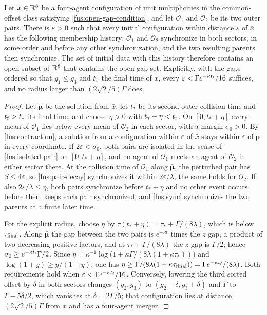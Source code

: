 Let $\bar x\in\mathbb R^8$ be a four-agent configuration of unit multiplicities in
the common-offset class satisfying \cref{fus:open-gap-condition}, and let
$\mathcal O_1$ and $\mathcal O_2$ be its two outer pairs. There is
$\varepsilon>0$ such that every initial configuration within distance
$\varepsilon$ of $\bar x$ has the following membership history:
$\mathcal O_1$ and $\mathcal O_2$ synchronize in both sectors, in some order
and before any other synchronization, and the two resulting parents then
synchronize. The set of initial data with this history therefore contains an
open subset of $\mathbb R^8$ that contains the open-gap set. Explicitly, with the
gaps ordered so that $g_1\leq g_3$ and $t_{\rm f}$ the final time of
$\bar x$, every $\varepsilon<\Gamma e^{-\kappa t_{\rm f}}/16$ suffices, and
no radius larger than $(2\sqrt2/5)\Gamma$ does.
\begin{proof}
Let $\bar{\boldsymbol\mu}$ be the solution from $\bar x$, let $t_*$ be its
second outer collision time and $t_{\rm f}>t_*$ its final time, and choose
$\eta>0$ with $t_*+\eta<t_{\rm f}$. On $[0,t_*+\eta]$ every mean of
$\mathcal O_1$ lies below every mean of $\mathcal O_2$ in each sector, with a
margin $\sigma_0>0$. By \cref{fus:contraction}, a solution from a
configuration within $\varepsilon$ of $\bar x$ stays within $\varepsilon$
of $\bar{\boldsymbol\mu}$ in every coordinate. If $2\varepsilon<\sigma_0$,
both pairs are isolated in the sense of \cref{fus:isolated-pair} on
$[0,t_*+\eta]$, and no agent of $\mathcal O_1$ meets an agent of
$\mathcal O_2$ in either sector there. At the collision time of
$\mathcal O_1$ along $\bar{\boldsymbol\mu}$, the perturbed pair has
$S\leq4\varepsilon$, so \cref{fus:pair-decay} synchronizes it within
$2\varepsilon/\lambda$; the same holds for $\mathcal O_2$. If also
$2\varepsilon/\lambda\leq\eta$, both pairs synchronize before
$t_*+\eta$ and no other event occurs before then. 
keeps each pair synchronized, and \cref{fus:sync} synchronizes the two
parents at a finite later time.

For the explicit radius, choose $\eta$ by
$\tau(t_*+\eta)=\tau_*+\Gamma/(8\lambda)$, which is below $\tau_{\rm final}$.
Along $\bar{\boldsymbol\mu}$ the gap between the two pairs is
$e^{-\kappa t}$ times the $z$ gap, a product of two decreasing positive
factors, and at $\tau_*+\Gamma/(8\lambda)$ the $z$ gap is $\Gamma/2$; hence
$\sigma_0\geq e^{-\kappa t_{\rm f}}\Gamma/2$. Since
$\eta=\kappa^{-1}\log\bigl(1+\kappa\Gamma/(8\lambda(1+\kappa\tau_*))\bigr)$
and $\log(1+y)\geq y/(1+y)$, one has
$\eta\geq\Gamma/(8\lambda(1+\kappa\tau_{\rm final}))=\Gamma e^{-\kappa t_{\rm f}}/(8\lambda)$.
Both requirements hold when $\varepsilon<\Gamma e^{-\kappa t_{\rm f}}/16$.
Conversely, lowering the third sorted offset by $\delta$ in both sectors
changes $(g_2,g_3)$ to $(g_2-\delta,g_3+\delta)$ and $\Gamma$ to
$\Gamma-5\delta/2$, which vanishes at $\delta=2\Gamma/5$; that configuration
lies at distance $(2\sqrt2/5)\Gamma$ from $\bar x$ and has a four-agent
merger.
\end{proof}

